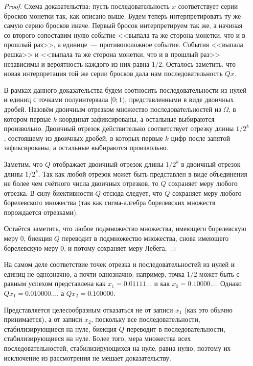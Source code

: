 \begin{proof}
	Схема доказательства:
	пусть последовательность $x$ соответствует серии бросков монетки так, как описано выше.
	Будем теперь интерпретировать ту же самую серию бросков иначе.
	Первый бросок интерпретируем так же,
	а начиная со второго сопоставим нулю событие <<выпала та же сторона монетки, что и в прошлый раз>>,
	а единице~--- противоположное событие.
	Cобытия <<выпала решка>> и <<выпала та же сторона монетки, что и в прошлый раз>> независимы
	и вероятность каждого из них равна $1/2$.
	Осталось заметить, что новая интерпретация той же серии бросков дала нам последовательность $Qx$.

	В рамках данного доказательства будем соотносить последовательности из нулей и единиц
	с точками полуинтервала $[0;1)$, представленными в виде двоичных дробей.
	Назовём двоичным отрезком множество последовательностей из $\Omega$,
	в котором первые $k$ координат зафиксированы, а остальные выбираются произвольно.
	Двоичный отрезок действительно соответствует отрезку длины $1/2^k$,
	состоящему из двоичных дробей, в которых первые $k$ цифр после запятой зафиксированы,
	а остальные выбираются произвольно.

	Заметим, что $Q$ отображает двоичный отрезок длины $1/2^k$ в двоичный отрезок длины $1/2^k$.
	Так как любой отрезок может быть представлен в виде объединения не более чем счётного числа
	двоичных отрезков, то $Q$ сохраняет меру любого отрезка.
	В силу биективности $Q$ отсюда следует, что $Q$ сохраняет меру любого борелевского множества
	(так как сигма-алгебра борелевских множеств порождается отрезками).

	Остаётся заметить, что любое подмножество множества, имеющего борелевскую меру 0,
	биекция $Q$ переводит в подмножество множества, снова имеющего борелевскую меру 0,
	и потому сохраняет меру Лебега.
\end{proof}

\begin{remark}
	На самом деле соответствие точек отрезка и последовательностей из нулей и единиц не однозначно,
	а почти однозначно: например, точка $1/2$ может быть с равным успехом
	представлена как $x_1=0.01111...$ и как $x_2=0.10000...$.
	Однако $Qx_1 = 0.010000...$, а $Qx_2=0.100000$.



	Представляется целесообразным отказаться не от записи $x_1$ (как это обычно принимается),
	а от записи $x_2$, поскольку все последовательности, стабилизирующиеся на нуле,
	биекция $Q$ переводит в последовательности, стабилизирующиеся на нуле.
	Более того, мера множества всех последовательностей, стабилизирующихся на нуле, равна нулю,
	поэтому их исключение из рассмотрения не мешает доказательству.
\end{remark}

